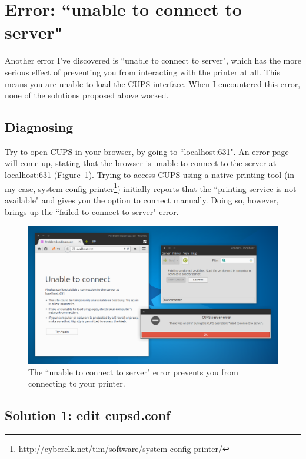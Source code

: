 \documentclass[12pt, a4paper]{article}
\begin{document}
\newpage
\section*{Error: ``unable to connect to server"}

Another error I've discovered is ``unable to connect to server", which has the more serious effect of preventing you from interacting with the printer at all. This means you are unable to load the CUPS interface. When I encountered this error, none of the solutions proposed above worked.

\subsection*{Diagnosing}

Try to open CUPS in your browser, by going to ``localhost:631". An error page will come up, stating that the browser is unable to connect to the server at localhost:631 (Figure~\ref{fig11}). Trying to access CUPS using a native printing tool (in my case, system-config-printer\footnote{\url{http://cyberelk.net/tim/software/system-config-printer/}}) initially reports that the ``printing service is not available" and gives you the option to connect manually. Doing so, however, brings up the ``failed to connect to server" error.

\begin{figure}[!htp]
  \centering
  \includegraphics[width=1\textwidth]{imgs/unable-to-connect-to-server-1.png}
  \caption{The ``unable to connect to server" error prevents you from connecting to your printer.}
  \label{fig11}
\end{figure}

\subsection*{Solution 1: edit cupsd.conf}
\end{document}
